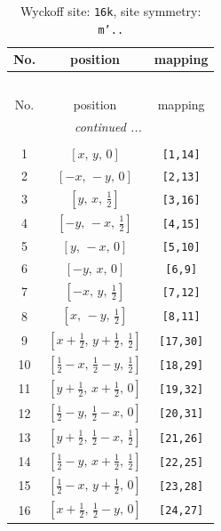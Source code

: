 \documentclass[fleqn,8pt]{jsarticle}
\begin{document}
\renewcommand{\arraystretch}{1.2}
\begin{longtable}{ccc}
\caption{Wyckoff site: {\tt 16k}, site symmetry: {\tt m'..}}
 \\
 \hline \hline
No. & position & mapping \\ \hline \endfirsthead

\multicolumn{2}{l}{\tablename\ \thetable{}} \\
 \hline \hline
No. & position & mapping \\ \hline \endhead

 \hline \hline
\multicolumn{2}{r}{\footnotesize\it continued ...} \\ \endfoot

 \hline \hline
\multicolumn{2}{r}{} \\ \endlastfoot

1 & $\left[ x,\, y,\, 0 \right]$ & {\tt [1,14]} \\ \hline
2 & $\left[ - x,\, - y,\, 0 \right]$ & {\tt [2,13]} \\ \hline
3 & $\left[ y,\, x,\, \frac{1}{2} \right]$ & {\tt [3,16]} \\ \hline
4 & $\left[ - y,\, - x,\, \frac{1}{2} \right]$ & {\tt [4,15]} \\ \hline
5 & $\left[ y,\, - x,\, 0 \right]$ & {\tt [5,10]} \\ \hline
6 & $\left[ - y,\, x,\, 0 \right]$ & {\tt [6,9]} \\ \hline
7 & $\left[ - x,\, y,\, \frac{1}{2} \right]$ & {\tt [7,12]} \\ \hline
8 & $\left[ x,\, - y,\, \frac{1}{2} \right]$ & {\tt [8,11]} \\ \hline
9 & $\left[ x + \frac{1}{2},\, y + \frac{1}{2},\, \frac{1}{2} \right]$ & {\tt [17,30]} \\ \hline
10 & $\left[ \frac{1}{2} - x,\, \frac{1}{2} - y,\, \frac{1}{2} \right]$ & {\tt [18,29]} \\ \hline
11 & $\left[ y + \frac{1}{2},\, x + \frac{1}{2},\, 0 \right]$ & {\tt [19,32]} \\ \hline
12 & $\left[ \frac{1}{2} - y,\, \frac{1}{2} - x,\, 0 \right]$ & {\tt [20,31]} \\ \hline
13 & $\left[ y + \frac{1}{2},\, \frac{1}{2} - x,\, \frac{1}{2} \right]$ & {\tt [21,26]} \\ \hline
14 & $\left[ \frac{1}{2} - y,\, x + \frac{1}{2},\, \frac{1}{2} \right]$ & {\tt [22,25]} \\ \hline
15 & $\left[ \frac{1}{2} - x,\, y + \frac{1}{2},\, 0 \right]$ & {\tt [23,28]} \\ \hline
16 & $\left[ x + \frac{1}{2},\, \frac{1}{2} - y,\, 0 \right]$ & {\tt [24,27]} \\
\end{longtable}
\end{document}
